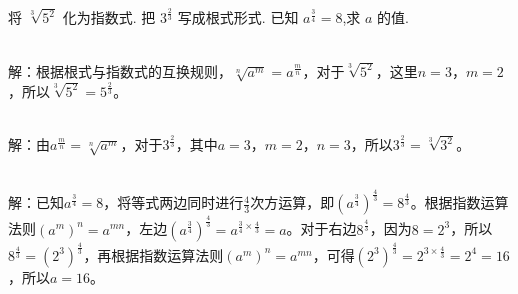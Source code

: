 \documentclass{ctexart}
\newenvironment{MyAnswer}[1][] %
{
    \begin{tcolorbox}[breakable, colframe=blue]
    \begin{Answer}[#1] \color{blue} \kaishu
        }  %
    {\end{Answer}
\end{tcolorbox}
}
\begin{document}
\begin{Exercise}[title={根式与指数式互换小练习}, label={ex:radical - exponential}]
    \Question 将 $\sqrt[3]{5^2}$ 化为指数式.
    \Question 把 $3^{\frac{2}{3}}$ 写成根式形式.
    \Question 已知 $a^{\frac{3}{4}} = 8$,求 $a$ 的值.
\end{Exercise}
\begin{MyAnswer}[ref={ex:radical - exponential}]
        \Question {}\\ 解：根据根式与指数式的互换规则，\(\sqrt[n]{a^m}=a^{\frac{m}{n}}\)，对于\(\sqrt[3]{5^2}\)，这里\(n = 3\)，\(m = 2\)，所以\(\sqrt[3]{5^2}=5^{\frac{2}{3}}\)。

        \Question {}\\ 解：由\(a^{\frac{m}{n}}=\sqrt[n]{a^m}\)，对于\(3^{\frac{2}{3}}\)，其中\(a = 3\)，\(m = 2\)，\(n = 3\)，所以\(3^{\frac{2}{3}}=\sqrt[3]{3^2}\)。

        \Question  {}\\  解：已知\(a^{\frac{3}{4}} = 8\)，将等式两边同时进行\(\frac{4}{3}\)次方运算，即\((a^{\frac{3}{4}})^{\frac{4}{3}}=8^{\frac{4}{3}}\)。根据指数运算法则\((a^m)^n=a^{mn}\)，左边\((a^{\frac{3}{4}})^{\frac{4}{3}}=a^{\frac{3}{4}\times\frac{4}{3}} = a\)。对于右边\(8^{\frac{4}{3}}\)，因为\(8 = 2^3\)，所以\(8^{\frac{4}{3}}=(2^3)^{\frac{4}{3}}\)，再根据指数运算法则\((a^m)^n=a^{mn}\)，可得\((2^3)^{\frac{4}{3}}=2^{3\times\frac{4}{3}} = 2^4 = 16\)，所以\(a = 16\)。
\end{MyAnswer}
\end{document}
